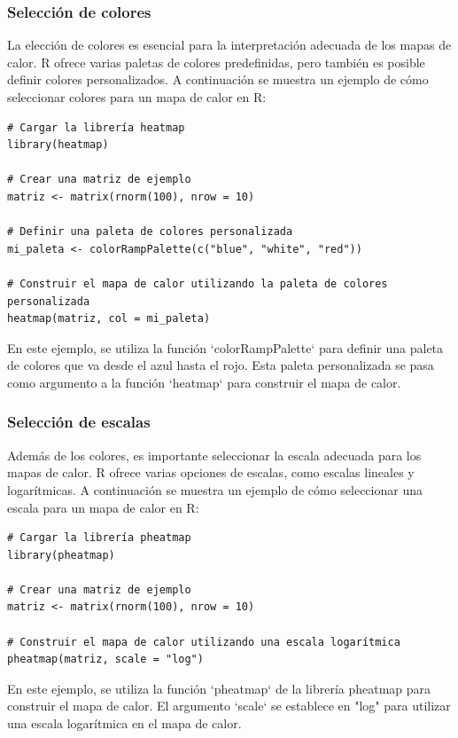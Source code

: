 \documentclass{article}
\begin{document}
\subsubsection{Selección de colores}
La elección de colores es esencial para la interpretación adecuada de los mapas de calor. R ofrece varias paletas de colores predefinidas, pero también es posible definir colores personalizados. A continuación se muestra un ejemplo de cómo seleccionar colores para un mapa de calor en R:

\begin{verbatim}
# Cargar la librería heatmap
library(heatmap)

# Crear una matriz de ejemplo
matriz <- matrix(rnorm(100), nrow = 10)

# Definir una paleta de colores personalizada
mi_paleta <- colorRampPalette(c("blue", "white", "red"))

# Construir el mapa de calor utilizando la paleta de colores personalizada
heatmap(matriz, col = mi_paleta)
\end{verbatim}

En este ejemplo, se utiliza la función `colorRampPalette` para definir una paleta de colores que va desde el azul hasta el rojo. Esta paleta personalizada se pasa como argumento a la función `heatmap` para construir el mapa de calor.

\subsubsection{Selección de escalas}
Además de los colores, es importante seleccionar la escala adecuada para los mapas de calor. R ofrece varias opciones de escalas, como escalas lineales y logarítmicas. A continuación se muestra un ejemplo de cómo seleccionar una escala para un mapa de calor en R:

\begin{verbatim}
# Cargar la librería pheatmap
library(pheatmap)

# Crear una matriz de ejemplo
matriz <- matrix(rnorm(100), nrow = 10)

# Construir el mapa de calor utilizando una escala logarítmica
pheatmap(matriz, scale = "log")
\end{verbatim}

En este ejemplo, se utiliza la función `pheatmap` de la librería pheatmap para construir el mapa de calor. El argumento `scale` se establece en "log" para utilizar una escala logarítmica en el mapa de calor.
\end{document}
